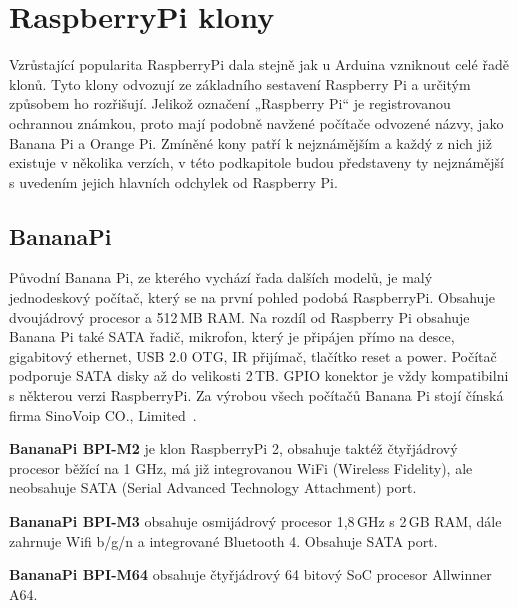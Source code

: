 \section{RaspberryPi klony}
\label{KapRaspiKlony}

Vzrůstající popularita RaspberryPi dala stejně jak u Arduina vzniknout celé řadě klonů. Tyto klony odvozují ze základního sestavení Raspberry Pi a určitým způsobem ho rozřišují. Jelikož označení „Raspberry Pi“ je registrovanou ochrannou známkou, proto mají podobně navžené počítače odvozené názvy, jako Banana Pi a Orange Pi. Zmíněné kony patří k nejznámějším a každý z nich již existuje v několika verzích, v této podkapitole budou představeny ty nejznámější s uvedením jejich hlavních odchylek od Raspberry Pi.

	\subsection{BananaPi}
		Původní Banana Pi, ze kterého vychází řada dalších modelů, je malý jednodeskový počítač, který se na první pohled podobá RaspberryPi.  Obsahuje dvoujádrový procesor a 512\,MB RAM. Na rozdíl od Raspberry Pi obsahuje Banana Pi také SATA řadič, mikrofon, který je připájen přímo na desce, gigabitový ethernet, USB 2.0 OTG, IR přijímač, tlačítko reset a power. Počítač podporuje SATA disky až do velikosti 2\,TB. GPIO konektor je vždy kompatibilni s některou verzi RaspberryPi. Za výrobou všech počítačů Banana Pi stojí čínská firma SinoVoip CO., Limited~\cite{BananaPi}.
		
	\textbf{BananaPi BPI-M2} je klon RaspberryPi 2, obsahuje taktéž čtyřjádrový procesor běžící na 1 GHz, má již integrovanou WiFi (Wireless Fidelity), ale neobsahuje SATA (Serial Advanced Technology Attachment) port.
	
	\textbf{BananaPi BPI-M3} obsahuje osmijádrový procesor 1,8\,GHz s 2\,GB RAM, dále zahrnuje Wifi b/g/n a integrované Bluetooth 4. Obsahuje SATA port.
	
	\textbf{BananaPi BPI-M64} obsahuje čtyřjádrový 64 bitový SoC procesor Allwinner A64.
	
